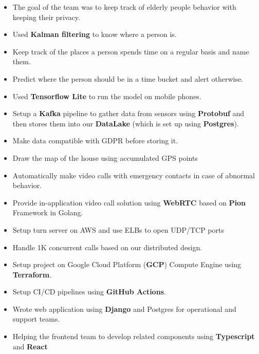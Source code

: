 \begin{itemize}
      \item The goal of the team was to keep track of elderly people behavior with keeping their privacy.
      \item Used \textbf{Kalman filtering} to know where a person is.
      \item Keep track of the places a person spends time on a regular basis and name them.
      \item Predict where the person should be in a time bucket and alert otherwise.
      \item Used \textbf{Tensorflow Lite} to run the model on mobile phones.
      \item Setup a \textbf{Kafka} pipeline to gather data from sensors using \textbf{Protobuf} and
            then stores them into our \textbf{DataLake} (which is set up using \textbf{Postgres}).
      \item Make data compatible with GDPR before storing it.
      \item Draw the map of the house using accumulated GPS points
      \item Automatically make video calls with emergency contacts in case of abnormal behavior.
      \item Provide in-application video call solution using \textbf{WebRTC} based on \textbf{Pion} Framework in Golang.
      \item Setup turn server on AWS and use ELBs to open UDP/TCP ports
      \item Handle 1K concurrent calls based on our distributed design.
      \item Setup project on Google Cloud Platform (\textbf{GCP}) Compute Engine using \textbf{Terraform}.
      \item Setup CI/CD pipelines using \textbf{GitHub Actions}.
      \item Wrote web application using \textbf{Django} and Postgres for operational and support teams.
      \item Helping the frontend team to develop related components using \textbf{Typescript} and \textbf{React}
\end{itemize}